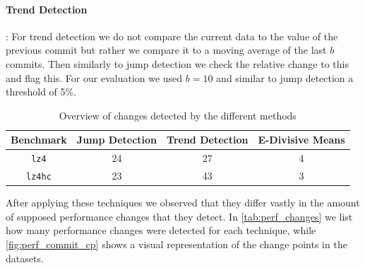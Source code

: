 \documentclass[	runningheads,
				a4paper]{llncs}
\begin{document}
\paragraph{Trend Detection}: For trend detection we do not compare the current data to the value of the previous commit but rather we compare it to a moving average of the last $b$ commits. Then similarly to jump detection we check the relative change to this and flag this. For our evaluation we used $b=10$ and similar to jump detection a threshold of 5\%.

\begin{table}
	\centering
	\begin{tabular}{|c||c|c|c|}
		\hline
		\textbf{Benchmark}&\textbf{Jump Detection}&\textbf{Trend Detection}&\textbf{E-Divisive Means}
		\\\hline\hline
		\texttt{lz4}&24&27&4
		\\\hline
		\texttt{lz4hc}&23&43&3
		\\\hline
	\end{tabular}
	\caption{Overview of changes detected by the different methods}
	\label{tab:perf_changes}
\end{table}
After applying these techniques we observed that they differ vastly in the amount of supposed performance changes that they detect. In \autoref{tab:perf_changes} we list how many performance changes were detected for each technique, while \autoref{fig:perf_commit_cp} shows a visual representation of the change points in the datasets.
\end{document}
